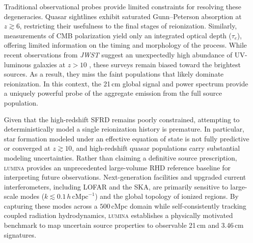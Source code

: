 \documentclass[apj,twocolumn, appendixfloats, twocolappendix, numberedappendix, tighten]{openjournal}
\DeclareRobustCommand{\lumina}{\mbox{\textsc{lumina}}\xspace}
\begin{document}
Traditional observational probes provide limited constraints for resolving these degeneracies. Quasar sightlines exhibit saturated Gunn--Peterson absorption at $z \gtrsim 6$, restricting their usefulness to the final stages of reionization. Similarly, measurements of CMB polarization yield only an integrated optical depth ($\tau_e$), offering limited information on the timing and morphology of the process. While recent observations from \textit{JWST} suggest an unexpectedly high abundance of UV-luminous galaxies at $z > 10$ \citep[][]{Naidu2022, Harikane2023}, these surveys remain biased toward the brightest sources. As a result, they miss the faint populations that likely dominate reionization. In this context, the 21\,cm global signal and power spectrum provide a uniquely powerful probe of the aggregate emission from the full source population.


Given that the high-redshift SFRD remains poorly constrained, attempting to deterministically model a single reionization history is premature. In particular, star formation modeled under an effective equation of state is not fully predictive or converged at $z \gtrsim 10$, and high-redshift quasar populations carry substantial modeling uncertainties. Rather than claiming a definitive source prescription, \lumina provides an unprecedented large-volume RHD reference baseline for interpreting future observations. Next-generation facilities and upgraded current interferometers, including LOFAR and the SKA, are primarily sensitive to large-scale modes ($k \lesssim 0.1\,h\,\mathrm{cMpc}^{-1}$) and the global topology of ionized regions. By capturing these modes across a $500\,\mathrm{cMpc}$ domain while self-consistently tracking coupled radiation hydrodynamics, \lumina establishes a physically motivated benchmark to map uncertain source properties to observable 21\,cm and 3.46\,cm signatures.

\end{document}
